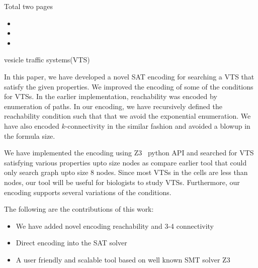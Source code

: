 Total two pages

\begin{itemize}
\item {}

\item {}

\item {}

\end{itemize}




vesicle traffic systems(VTS)





%

In this paper, we have developed a novel SAT encoding for
searching a VTS that satisfy the given properties.
%
We improved the encoding of some of the conditions for VTSs.
%
In the earlier implementation, reachability was encoded by
enumeration of paths.
%
In our encoding, we have recursively defined the reachability condition
such that that we avoid the exponential enumeration.
%
We have also encoded $k$-connectivity in the similar fashion and
avoided a blowup in the formula size.
%

We have implemented the encoding using Z3~\cite{z3} python API and searched for
VTS satisfying various properties upto size  nodes as compare
earlier tool that could only search graph upto size 8 nodes.
%
Since most VTSs in the cells are less than  nodes,
our tool will be useful for biologists to study VTSs.
%
Furthermore, our encoding supports several variations of
the conditions.


The following are the contributions of this work:
\begin{itemize}
\item We have added novel encoding reachability and 3-4 connectivity
\item Direct encoding into the SAT solver
\item A user friendly and scalable tool based on well known SMT solver Z3
\end{itemize}


